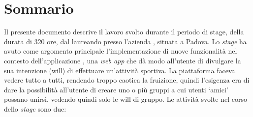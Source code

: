 
\cleardoublepage
{}
{}
\begingroup
\let\clearpage\relax
\let\cleardoublepage\relax
\let\cleardoublepage\relax

\chapter*{Sommario}

Il presente documento descrive il lavoro svolto durante il periodo di stage,
della durata di 320 ore, dal laureando \myName\xspace presso
l'azienda \myCompany, situata a Padova.
Lo \textit{stage} ha avuto come argomento principale l'implementazione di nuove
funzionalità nel contesto dell'applicazione \productName, una
\textit{web app} che dà modo all'utente di divulgare la sua intenzione
(\gls{will}) di effettuare un'attività sportiva.
La piattaforma faceva vedere tutto a tutti, rendendo troppo caotica la
fruizione, quindi l'esigenza era di dare la possibilità all'utente
di creare uno o più gruppi a cui utenti \enquote*{amici} possano unirsi,
vedendo quindi solo le \gls{will} di gruppo.
Le attività svolte nel corso dello \textit{stage} sono due:
